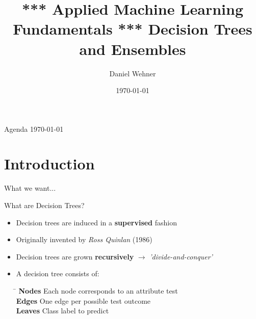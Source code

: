 


\title[Decision Trees and Ensembles]{*** Applied Machine Learning Fundamentals *** Decision Trees and Ensembles}
\author{Daniel Wehner}
\date{\today}




\maketitlepage


\begin{frame}{Agenda \today}
	\begin{multicols}{2}
		\tableofcontents
	\end{multicols}
\end{frame}


\section{Introduction}

\begin{frame}{What we want...}{}
\end{frame}


\begin{frame}{What are Decision Trees?}{}
	\begin{itemize}
		\item Decision trees are induced in a \textbf{supervised} fashion
		\item Originally invented by \textit{Ross Quinlan} (1986)
		\item Decision trees are grown \textbf{recursively} $\rightarrow$ \textit{'divide-and-conquer'}
		\item A decision tree consists of:

		\begin{tabbing}
			\hspace*{2.5cm}\= \kill
			\textbf{Nodes}	\>	Each node corresponds to an attribute test 	\\
			\textbf{Edges}	\>	One edge per possible test outcome			\\
			\textbf{Leaves}	\>	Class label to predict
		\end{tabbing}
	\end{itemize}
\end{frame}


